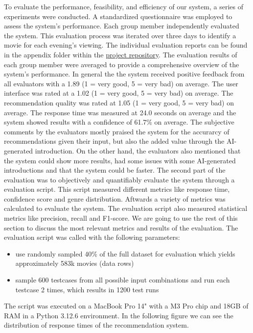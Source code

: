 \documentclass[12pt,a4paper]{article}
\begin{document}
To evaluate the performance, feasibility, and efficiency of our system, a series of experiments were conducted.
A standardized questionnaire was employed to assess the system’s performance.
Each group member independently evaluated the system.
This evaluation process was iterated over three days to identify a movie for each evening’s viewing.
The individual evaluation reports can be found in the appendix folder within the
\href{https://github.com/IImpaq/air-2024/appendix}{project repository}.
The evaluation results of each group member were averaged to provide a comprehensive overview of the system’s performance.
In general the the system received positive feedback from all evaluators with a 1.89 (1 = very good, 5 = very bad) on average.
The user interface was rated at a 1.02 (1 = very good, 5 = very bad) on average.
The recommendation quality was rated at 1.05 (1 = very good, 5 = very bad) on average.
The response time was measured at 24.0 seconds on average and the system showed results with a confidence of 61.7\% on average.
The subjective comments by the evaluators mostly praised the system for the accurarcy of recommendations given their input, but also the added value through the AI-generated introduction.
On the other hand, the evaluators also mentioned that the system could show more results, had some issues with some AI-generated introductions and that the system could be faster.
\newline \noindent The second part of the evaluation was to objectively and quantifiably evaluate the system through a evaluation script.
This script measured different metrics like response time, confidence score and genre distribution.
Aftwards a variety of metrics was calculated to evaluate the system.
The evaluation script also measured statistical metrics like precision, recall and F1-score.
We are going to use the rest of this section to discuss the most relevant metrics and results of the evaluation.
The evaluation script was called with the following parameters:
\begin{itemize}
  \item use randomly sampled 40\% of the full dataset for evaluation which yields approximately 583k movies (data rows)
  \item sample 600 testcases from all possible input combinations and run each testcase 2 times, which results in 1200 test runs
\end{itemize}

\noindent The script was executed on a MacBook Pro 14" with a M3 Pro chip and 18GB of RAM in a Python 3.12.6 environment.
In the following figure we can see the distribution of response times of the recommendation system.
\end{document}
